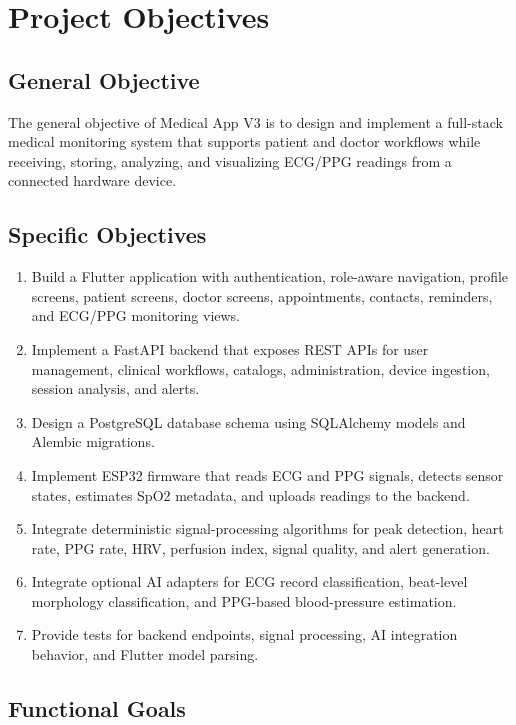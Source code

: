 \chapter{Project Objectives}

\section{General Objective}

The general objective of Medical App V3 is to design and implement a full-stack medical monitoring system that supports patient and doctor workflows while receiving, storing, analyzing, and visualizing ECG/PPG readings from a connected hardware device.

\section{Specific Objectives}

\begin{enumerate}[leftmargin=*]
    \item Build a Flutter application with authentication, role-aware navigation, profile screens, patient screens, doctor screens, appointments, contacts, reminders, and ECG/PPG monitoring views.
    \item Implement a FastAPI backend that exposes REST APIs for user management, clinical workflows, catalogs, administration, device ingestion, session analysis, and alerts.
    \item Design a PostgreSQL database schema using SQLAlchemy models and Alembic migrations.
    \item Implement ESP32 firmware that reads ECG and PPG signals, detects sensor states, estimates SpO2 metadata, and uploads readings to the backend.
    \item Integrate deterministic signal-processing algorithms for peak detection, heart rate, PPG rate, HRV, perfusion index, signal quality, and alert generation.
    \item Integrate optional AI adapters for ECG record classification, beat-level morphology classification, and PPG-based blood-pressure estimation.
    \item Provide tests for backend endpoints, signal processing, AI integration behavior, and Flutter model parsing.
\end{enumerate}

\section{Functional Goals}

